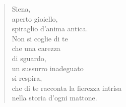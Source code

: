 
\begin{verse}
    Siena,\\
    aperto gioiello,\\
    spiraglio d'anima antica.\\
    Non si coglie di te\\
    che una carezza\\
    di sguardo,\\
    un sussurro inadeguato\\
    si respira,\\
    che di te racconta la fierezza intrisa\\
    nella storia d'ogni mattone.
\end{verse}